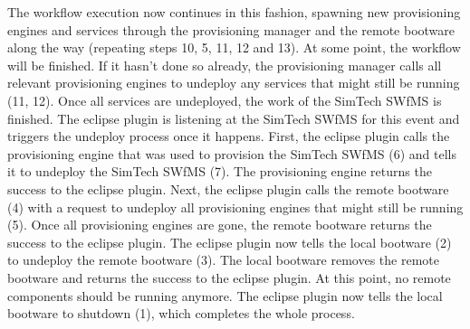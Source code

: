 The workflow execution now continues in this fashion, spawning new provisioning engines and services through the provisioning manager and the remote bootware along the way (repeating steps 10, 5, 11, 12 and 13).
At some point, the workflow will be finished.
If it hasn't done so already, the provisioning manager calls all relevant provisioning engines to undeploy any services that might still be running (11, 12).
Once all services are undeployed, the work of the SimTech SWfMS is finished.
The eclipse plugin is listening at the SimTech SWfMS for this event and triggers the undeploy process once it happens.
First, the eclipse plugin calls the provisioning engine that was used to provision the SimTech SWfMS (6) and tells it to undeploy the SimTech SWfMS (7).
The provisioning engine returns the success to the eclipse plugin.
Next, the eclipse plugin calls the remote bootware (4) with a request to undeploy all provisioning engines that might still be running (5).
Once all provisioning engines are gone, the remote bootware returns the success to the eclipse plugin.
The eclipse plugin now tells the local bootware (2) to undeploy the remote bootware (3).
The local bootware removes the remote bootware and returns the success to the eclipse plugin.
At this point, no remote components should be running anymore.
The eclipse plugin now tells the local bootware to shutdown (1), which completes the whole process.
